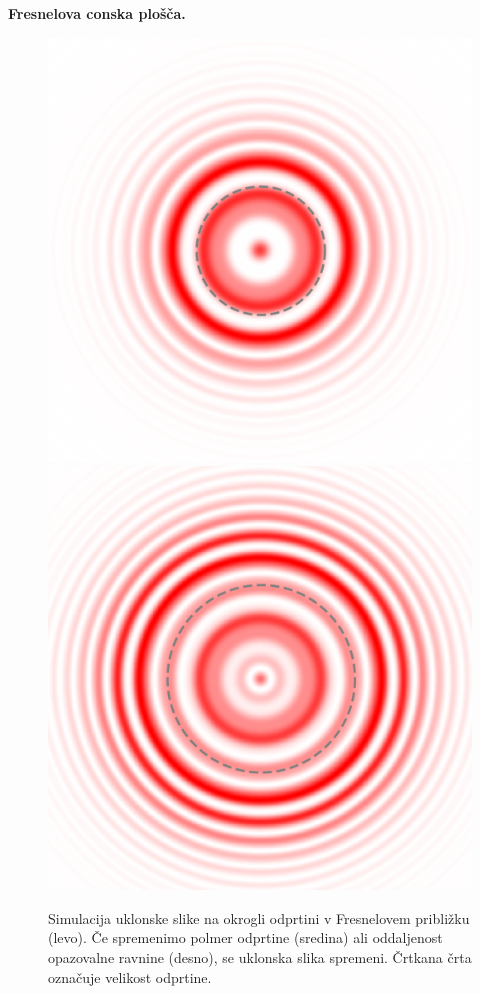 \begin{example}{\bf Fresnelova conska plošča.}
\begin{figure}[ht]
\includegraphics[width=40truemm]{slike/05_Fresnel_circ_k11_r07.png}\qquad
\includegraphics[width=40truemm]{slike/05_Fresnel_circ_k10_r1.png}\qquad
\caption{Simulacija uklonske slike na okrogli odprtini v Fresnelovem približku (levo).
Če spremenimo polmer odprtine (sredina) ali oddaljenost opazovalne ravnine (desno),
se uklonska slika spremeni. Črtkana črta označuje velikost odprtine.}
\label{fig:05_cirkularna_sim}
\end{figure}


\end{example}
